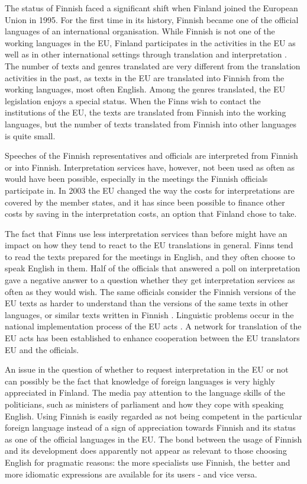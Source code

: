 \documentclass[]{../../metanetpaper}
\begin{document}
\begin{Parallel}[c]{77mm}{77mm}
{The status of Finnish faced a significant shift when Finland joined
the European Union in 1995. For the first time in its history, Finnish
became one of the official languages of an international
organisation. While Finnish is not one of the working languages in the
EU, Finland participates in the activities in the EU as well as in
other international settings through translation and
interpretation \cite{Tulevaisuus2009}. The number of texts and genres
translated are very different from the translation activities in the
past, as texts in the EU are translated into Finnish from the working
languages, most often English.  Among the genres translated, the EU
legislation enjoys a special status. When the Finns wish to contact
the institutions of the EU, the texts are translated from Finnish into
the working languages, but the number of texts translated from Finnish
into other languages is quite small.

Speeches of the Finnish representatives and officials are interpreted
from Finnish or into Finnish. Interpretation services have, however,
not been used as often as would have been possible, especially in the
meetings the Finnish officials participate in. In 2003 the EU changed
the way the costs for interpretations are covered by the member
states, and it has since been possible to finance other costs by
saving in the interpretation costs, an option that Finland chose to
take.

The fact that Finns use less interpretation services than before might
have an impact on how they tend to react to the EU translations in
general. Finns tend to read the texts prepared for the meetings in
English, and they often choose to speak English in them. Half of the
officials that answered a poll on interpretation gave a negative
answer to a question whether they get interpretation services as often
as they would wish. The same officials consider the Finnish versions
of the EU texts as harder to understand than the versions of the same
texts in other languages, or similar texts written in Finnish
\cite{Piehl2008}. Linguistic problems occur in the national
implementation process of the EU acts \cite{OECD2010-en}. A network
for translation of the EU acts has been established to enhance
cooperation between the EU translators EU and the officials.

An issue in the question of whether to request interpretation in the
EU or not can possibly be the fact that knowledge of foreign languages
is very highly appreciated in Finland. The media pay attention to the
language skills of the politicians, such as ministers of parliament
and how they cope with speaking English. Using Finnish is easily
regarded as not being competent in the particular foreign language
instead of a sign of appreciation towards Finnish and its status as
one of the official languages in the EU. The bond between the usage of
Finnish and its development does apparently not appear as relevant to
those choosing English for pragmatic reasons: the more specialists use
Finnish, the better and more idiomatic expressions are available for
its users - and vice versa.

}
\end{Parallel}
\end{document}
